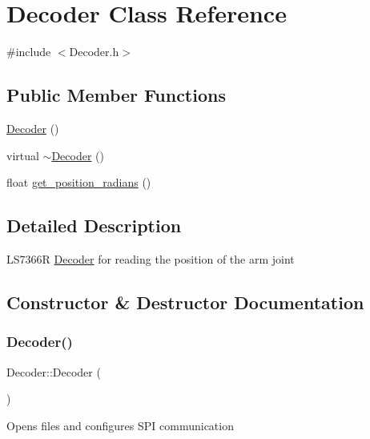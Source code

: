 \hypertarget{classDecoder}{}\section{Decoder Class Reference}
\label{classDecoder}


{\ttfamily \#include $<$Decoder.\+h$>$}

\subsection*{Public Member Functions}
\begin{DoxyCompactItemize}
\item 
\mbox{\hyperlink{classDecoder_a691a867940a1c494b77e458ae1325352}{Decoder}} ()
\item 
virtual \mbox{\hyperlink{classDecoder_a8b70f4475ae0852b138d63f6d8ddb298}{$\sim$\+Decoder}} ()
\item 
float \mbox{\hyperlink{classDecoder_a27b38533ded3df3b1d81011105d0ae73}{get\+\_\+position\+\_\+radians}} ()
\end{DoxyCompactItemize}


\subsection{Detailed Description}
L\+S7366R \mbox{\hyperlink{classDecoder}{Decoder}} for reading the position of the arm joint 

\subsection{Constructor \& Destructor Documentation}
\mbox{\label{classDecoder_a691a867940a1c494b77e458ae1325352}} 
\subsubsection{\texorpdfstring{Decoder()}{Decoder()}}
{\footnotesize\ttfamily Decoder\+::\+Decoder (\begin{DoxyParamCaption}{ }\end{DoxyParamCaption})}

Opens files and configures S\+PI communication \mbox{\label{classDecoder_a8b70f4475ae0852b138d63f6d8ddb298}} 
